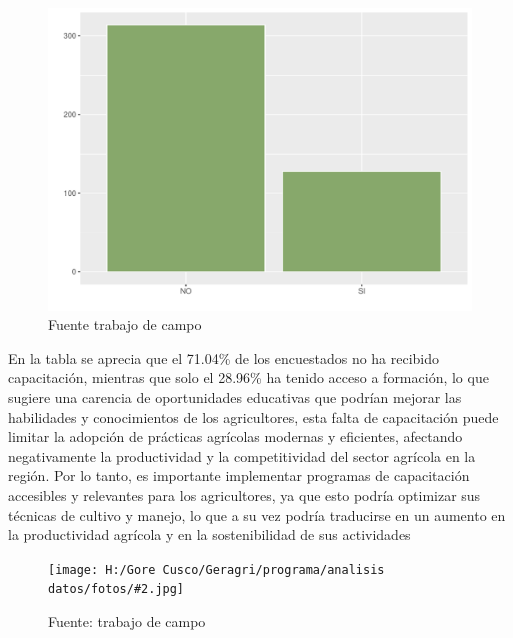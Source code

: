 \documentclass{article}\usepackage[]{graphicx}\usepackage[table]{xcolor}
\makeatletter
\def\maxwidth{ %
  \ifdim\Gin@nat@width>\linewidth
    \linewidth
  \else
    \Gin@nat@width
  \fi
}
\newenvironment{knitrout}{}{} %
\newenvironment{fotos}[2]
{\begin{figure}[H]
	\centering
	\caption{#1}
	\texttt{[image: H:/Gore Cusco/Geragri/programa/analisis datos/fotos/\#2.jpg]}
	\caption*{Fuente: trabajo de campo}}
{\end{figure}}
\newenvironment{graficas}[2]
{\begin{figure}[H]
		\centering
		\caption{#1}
		#2
		\caption*{Fuente trabajo de campo}}
{\end{figure}}
\makeatother
\begin{document}
\begin{graficas}
{Ha recibido alguna capacitacion}{
\begin{knitrout}
\definecolor{shadecolor}{rgb}{0.969, 0.969, 0.969}\color{fgcolor}
\includegraphics[width=\maxwidth]{figure/fig_treintayseis-1} 
\end{knitrout}
}
\end{graficas}
En la tabla se aprecia que el 71.04\% de los encuestados no ha recibido capacitación, mientras que solo el 28.96\% ha tenido acceso a formación, lo que sugiere una carencia de oportunidades educativas que podrían mejorar las habilidades y conocimientos de los agricultores, esta falta de capacitación puede limitar la adopción de prácticas agrícolas modernas y eficientes, afectando negativamente la productividad y la competitividad del sector agrícola en la región. Por lo tanto, es importante implementar programas de capacitación accesibles y relevantes para los agricultores, ya que esto podría optimizar sus técnicas de cultivo y manejo, lo que a su vez podría traducirse en un aumento en la productividad agrícola y en la sostenibilidad de sus actividades
\begin{fotos}
{trabajo de campo}{34}
\end{fotos}
\end{document}
